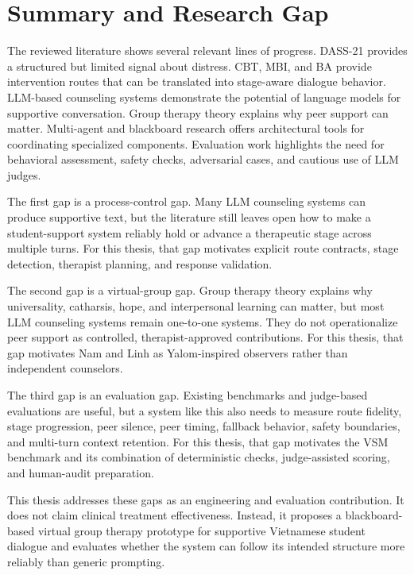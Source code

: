 \section{Summary and Research Gap}

The reviewed literature shows several relevant lines of progress. DASS-21 provides a structured but limited signal about distress. CBT, MBI, and BA provide intervention routes that can be translated into stage-aware dialogue behavior. LLM-based counseling systems demonstrate the potential of language models for supportive conversation. Group therapy theory explains why peer support can matter. Multi-agent and blackboard research offers architectural tools for coordinating specialized components. Evaluation work highlights the need for behavioral assessment, safety checks, adversarial cases, and cautious use of LLM judges.

The first gap is a process-control gap. Many LLM counseling systems can produce supportive text, but the literature still leaves open how to make a student-support system reliably hold or advance a therapeutic stage across multiple turns. For this thesis, that gap motivates explicit route contracts, stage detection, therapist planning, and response validation.

The second gap is a virtual-group gap. Group therapy theory explains why universality, catharsis, hope, and interpersonal learning can matter, but most LLM counseling systems remain one-to-one systems. They do not operationalize peer support as controlled, therapist-approved contributions. For this thesis, that gap motivates Nam and Linh as Yalom-inspired observers rather than independent counselors.

The third gap is an evaluation gap. Existing benchmarks and judge-based evaluations are useful, but a system like this also needs to measure route fidelity, stage progression, peer silence, peer timing, fallback behavior, safety boundaries, and multi-turn context retention. For this thesis, that gap motivates the VSM benchmark and its combination of deterministic checks, judge-assisted scoring, and human-audit preparation.

This thesis addresses these gaps as an engineering and evaluation contribution. It does not claim clinical treatment effectiveness. Instead, it proposes a blackboard-based virtual group therapy prototype for supportive Vietnamese student dialogue and evaluates whether the system can follow its intended structure more reliably than generic prompting.

